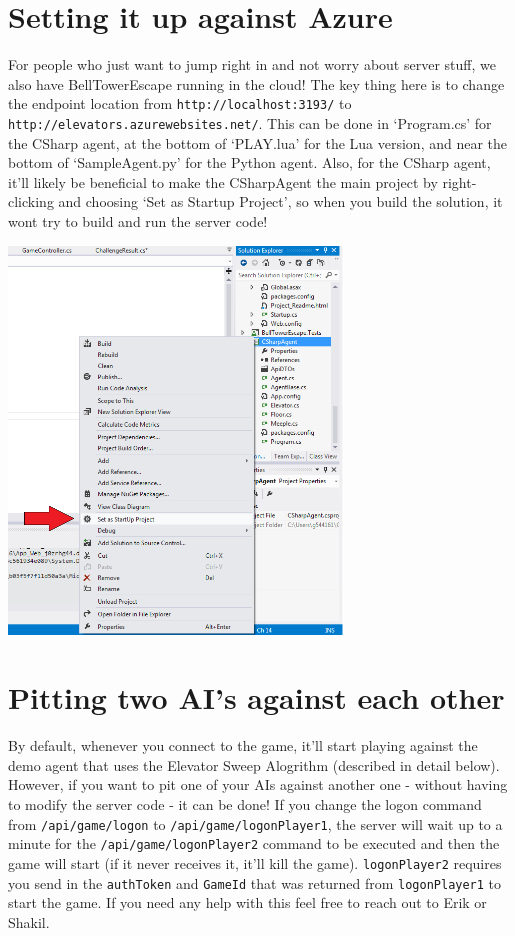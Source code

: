 \documentclass{article}
\begin{document}
\section*{Setting it up against Azure}
For people who just want to jump right in and not worry about server stuff, we also have BellTowerEscape running in the cloud! The key thing here is to change the endpoint location from \verb|http://localhost:3193/| to \verb|http://elevators.azurewebsites.net/|. This can be done in `Program.cs' for the CSharp agent, at the bottom of `PLAY.lua' for the Lua version, and near the bottom of `SampleAgent.py' for the Python agent. Also, for the CSharp agent, it'll likely be beneficial to make the CSharpAgent the main project by right-clicking and choosing `Set as Startup Project', so when you build the solution, it wont try to build and run the server code! 

\includegraphics[width=3.5in]{set-as-startup.png}

\section*{Pitting two AI's against each other}
By default, whenever you connect to the game, it'll start playing against the demo agent that uses the Elevator Sweep Alogrithm (described in detail below). However, if you want to pit one of your AIs against another one - without having to modify the server code - it can be done! If you change the logon command from \verb|/api/game/logon| to \verb|/api/game/logonPlayer1|, the server will wait up to a minute for the \verb|/api/game/logonPlayer2| command to be executed and then the game will start (if it never receives it, it'll kill the game). \verb|logonPlayer2| requires you send in the \verb|authToken| and \verb|GameId| that was returned from \verb|logonPlayer1| to start the game. If you need any help with this feel free to reach out to Erik or Shakil.
\end{document}
